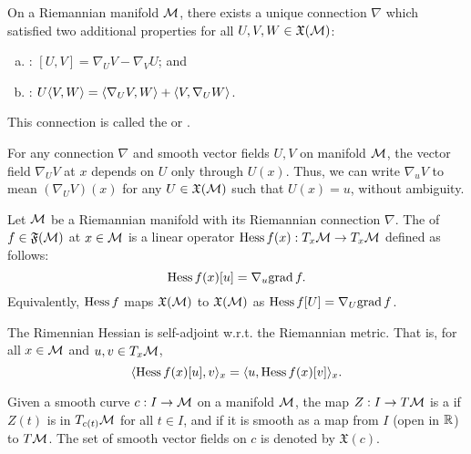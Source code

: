 \documentclass[11pt,a4paper]{article}
\begin{document}
\begin{prop}
On a Riemannian manifold $\mathcal{M}$, there exists a unique connection $\nabla$ which satisfied two additional properties for all $U,V,W\in\mathfrak{X}(\mathcal{M})$:
\begin{enumerate}[(d)]
    \item {}: $[U,V] = \nabla_U V - \nabla_V U$; and
    \item {}: $U\langle V, W \rangle = \langle \nabla_U V, W \rangle + \langle V, \nabla_U W \rangle$.
\end{enumerate}
This connection is called the  or .
\end{prop}

\begin{prop}
For any connection $\nabla$ and smooth vector fields $U, V$ on manifold $\mathcal{M}$, the vector field $\nabla_U V$ at $x$ depends on $U$ only through $U(x)$. Thus, we can write $\nabla_u V$ to mean $(\nabla_U V)(x)$ for any $U\in\mathfrak{X}(\mathcal{M})$ such that $U(x) = u$, without ambiguity.
\end{prop}

\begin{mydef}
Let $\mathcal{M}$ be a Riemannian manifold with its Riemannian connection $\nabla$. The  of $f\in \mathfrak{F}(\mathcal{M})$ at $x\in\mathcal{M}$ is a linear operator $\text{Hess}\, f(x):T_x\mathcal{M}\rightarrow T_x\mathcal{M}$ defined as follows:
\begin{equation*}
    \text{Hess}\, f(x)[u] = \nabla_u \text{grad}\, f.
\end{equation*}
Equivalently, $\text{Hess}\, f$ maps $\mathfrak{X}(\mathcal{M})$ to $\mathfrak{X}(\mathcal{M})$ as $\text{Hess}\, f[U] = \nabla_U\text{grad}\, f$.
\end{mydef}

\begin{prop}
The Rimennian Hessian is self-adjoint w.r.t. the Riemannian metric. That is, for all $x\in \mathcal{M}$ and $u,v\in T_x\mathcal{M}$,
\begin{equation*}
\langle \text{Hess}\, f(x)[u], v \rangle_x = \langle u, \text{Hess}\, f(x)[v] \rangle_x.
\end{equation*}
\end{prop}

\begin{mydef}
Given a smooth curve $c:I\rightarrow \mathcal{M}$ on a manifold $\mathcal{M}$, the map $Z:I\rightarrow T\mathcal{M}$ is a  if $Z(t)$ is in $T_{c(t)}\mathcal{M}$ for all $t\in I$, and if it is smooth as a map from $I$ (open in $\mathbb{R}$) to $T\mathcal{M}$. The set of smooth vector fields on $c$ is denoted by $\mathfrak{X}(c)$.
\end{mydef}
\end{document}
